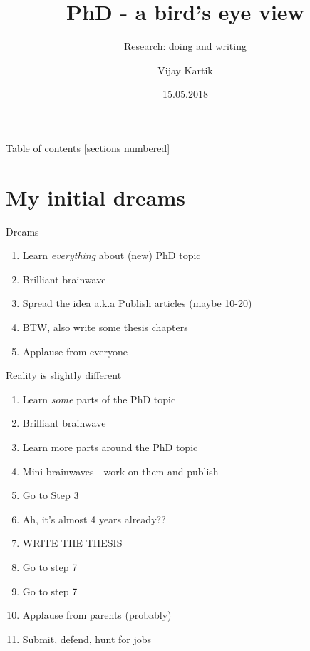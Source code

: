 \documentclass[10pt]{beamer}
\title{PhD - a bird's eye view}
\subtitle{Research: doing and writing}
\date{15.05.2018}
\author{Vijay Kartik}
\begin{document}
\maketitle

\begin{frame}{Table of contents}
  [sections numbered]
  \tableofcontents[hideallsubsections]
\end{frame}

\section{My initial dreams}

\begin{frame}{Dreams}
\begin{enumerate}[<+- | alert@+>]
    \item Learn \emph{everything} about (new) PhD topic
    \item Brilliant brainwave
    \item Spread the idea a.k.a Publish articles (maybe 10-20)
    \item BTW, also write some thesis chapters
    \item Applause from everyone
\end{enumerate}
\end{frame}

\begin{frame}{Reality is slightly different}
\begin{enumerate}[<+- | alert@+>]
    \item Learn \emph{some} parts of the PhD topic
    \item Brilliant brainwave
    \item Learn more parts around the PhD topic
    \item Mini-brainwaves - work on them and publish
    \item Go to Step 3
    \item Ah, it's almost 4 years already??
    \item WRITE THE THESIS
    \item Go to step 7
    \item Go to step 7
    \item Applause from parents (probably)
    \item Submit, defend, hunt for jobs
\end{enumerate}

\end{frame}
\end{document}
